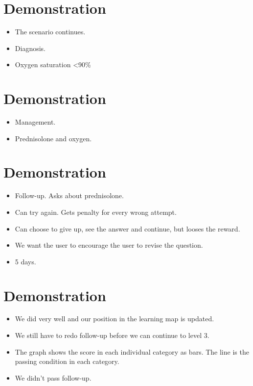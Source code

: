 \documentclass[20pt]{extarticle}
\begin{document}
	\section{Demonstration}
	\begin{itemize}
		\item The scenario continues.
		\item Diagnosis.
		\item Oxygen saturation <90\%
	\end{itemize}

	\section{Demonstration}
	\begin{itemize}
		\item Management.
		\item Prednisolone and oxygen.
	\end{itemize}

	\section{Demonstration}
	\begin{itemize}
		\item Follow-up. Asks about prednisolone.
		\item Can try again. Gets penalty for every wrong attempt.
		\item Can choose to give up, see the answer and continue, but looses the reward.
		\item We want the user to encourage the user to revise the question.
		\item 5 days.
	\end{itemize}

	\section{Demonstration}
	\begin{itemize}
		\item We did very well and our position in the learning map is updated.
		\item We still have to redo follow-up before we can continue to level 3.
		\item The graph shows the score in each individual category as bars. The line is the passing condition in each category.
		\item We didn't pass follow-up.
	\end{itemize}
\end{document}
